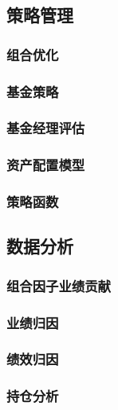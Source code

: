 \documentclass[11pt]{article}
\begin{document}
\subsection{策略管理}
\label{sec:orgheadline117}

\subsubsection{组合优化}
\label{sec:orgheadline112}

\subsubsection{基金策略}
\label{sec:orgheadline113}

\subsubsection{基金经理评估}
\label{sec:orgheadline114}

\subsubsection{资产配置模型}
\label{sec:orgheadline115}

\subsubsection{策略函数}
\label{sec:orgheadline116}
\subsection{数据分析}
\label{sec:orgheadline123}

\subsubsection{组合因子业绩贡献}
\label{sec:orgheadline118}

\subsubsection{业绩归因}
\label{sec:orgheadline119}

\subsubsection{绩效归因}
\label{sec:orgheadline120}

\subsubsection{持仓分析}
\label{sec:orgheadline121}
\end{document}
